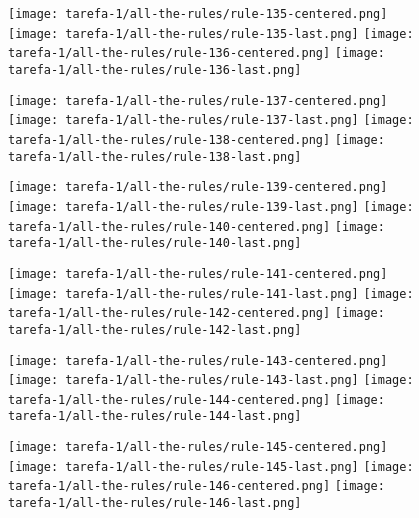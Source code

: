 \begin{figure}[htbp]
  \centering
\texttt{[image: tarefa-1/all-the-rules/rule-135-centered.png]}
\texttt{[image: tarefa-1/all-the-rules/rule-135-last.png]}
\texttt{[image: tarefa-1/all-the-rules/rule-136-centered.png]}
\texttt{[image: tarefa-1/all-the-rules/rule-136-last.png]}
\end{figure}
\begin{figure}[htbp]
  \centering
\texttt{[image: tarefa-1/all-the-rules/rule-137-centered.png]}
\texttt{[image: tarefa-1/all-the-rules/rule-137-last.png]}
\texttt{[image: tarefa-1/all-the-rules/rule-138-centered.png]}
\texttt{[image: tarefa-1/all-the-rules/rule-138-last.png]}
\end{figure}
\begin{figure}[htbp]
  \centering
\texttt{[image: tarefa-1/all-the-rules/rule-139-centered.png]}
\texttt{[image: tarefa-1/all-the-rules/rule-139-last.png]}
\texttt{[image: tarefa-1/all-the-rules/rule-140-centered.png]}
\texttt{[image: tarefa-1/all-the-rules/rule-140-last.png]}
\end{figure}
\begin{figure}[htbp]
  \centering
\texttt{[image: tarefa-1/all-the-rules/rule-141-centered.png]}
\texttt{[image: tarefa-1/all-the-rules/rule-141-last.png]}
\texttt{[image: tarefa-1/all-the-rules/rule-142-centered.png]}
\texttt{[image: tarefa-1/all-the-rules/rule-142-last.png]}
\end{figure}
\begin{figure}[htbp]
  \centering
\texttt{[image: tarefa-1/all-the-rules/rule-143-centered.png]}
\texttt{[image: tarefa-1/all-the-rules/rule-143-last.png]}
\texttt{[image: tarefa-1/all-the-rules/rule-144-centered.png]}
\texttt{[image: tarefa-1/all-the-rules/rule-144-last.png]}
\end{figure}
\begin{figure}[htbp]
  \centering
\texttt{[image: tarefa-1/all-the-rules/rule-145-centered.png]}
\texttt{[image: tarefa-1/all-the-rules/rule-145-last.png]}
\texttt{[image: tarefa-1/all-the-rules/rule-146-centered.png]}
\texttt{[image: tarefa-1/all-the-rules/rule-146-last.png]}
\end{figure}
